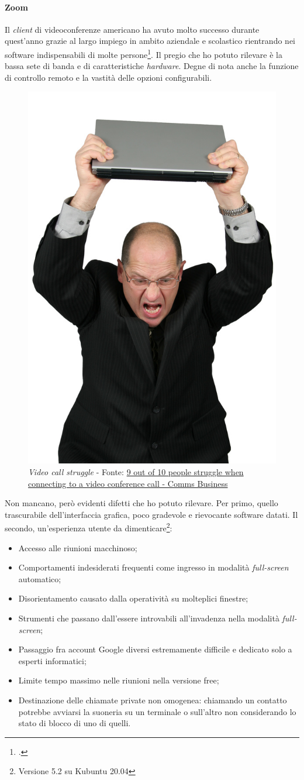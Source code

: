 \paragraph{Zoom} Il \textit{client} di videoconferenze americano ha avuto molto successo durante quest'anno grazie al largo impiego in ambito aziendale e scolastico rientrando nei software indispensabili di molte persone\footcite{site:zoomBlog}. Il pregio che ho potuto rilevare è la bassa sete di banda e di caratteristiche \textit{hardware}. Degne di nota anche la funzione di controllo remoto e la vastità delle opzioni configurabili.
\vspace{30pt}
\begin{figure}[H]
    \centering
    \includegraphics[width=0.35\columnwidth]{immagini/vc_struggle.jpg}
    \caption{\textit{Video call struggle} - Fonte: \href{https://www.commsbusiness.co.uk/news/9-out-of-10-people-struggle-when-connecting-to-a-video-conference-call/}{9 out of 10 people struggle when connecting to a video conference call - Comms Business}}
    \label{fig:vcStruggle}
\end{figure}
Non mancano, però evidenti difetti che ho potuto rilevare. Per primo, quello trascurabile dell'interfaccia grafica, poco gradevole e rievocante software datati. Il secondo, un'esperienza utente da dimenticare\footnote{Versione 5.2 su Kubuntu 20.04}:
\begin{itemize}
    \item Accesso alle riunioni macchinoso;
    \item Comportamenti indesiderati frequenti come ingresso in modalità \textit{full-screen} automatico;
    \item Disorientamento causato dalla operatività su molteplici finestre;
    \item Strumenti che passano dall'essere introvabili all'invadenza nella modalità \textit{full-screen};
    \item Passaggio fra account Google diversi estremamente difficile e dedicato solo a esperti informatici;
    \item Limite tempo massimo nelle riunioni nella versione free;
    \item Destinazione delle chiamate private non omogenea: chiamando un contatto potrebbe avviarsi la suoneria su un terminale o sull'altro non considerando lo stato di blocco di uno di quelli.
\end{itemize}
